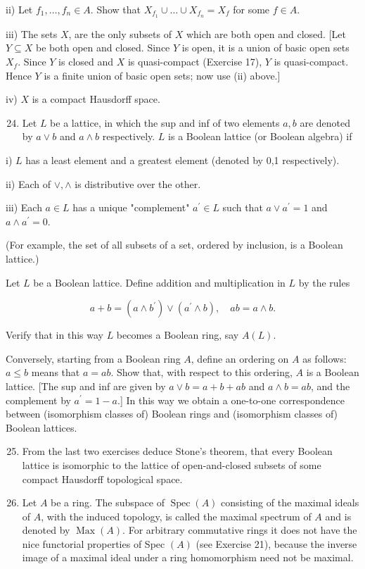 \documentclass{standalone}
\theoremstyle{definition}
\theoremstyle{remark}
\begin{document}
ii) Let $f_{1}, \ldots, f_{n} \in A$. Show that $X_{f_{1}} \cup \ldots \cup X_{f_{n}}=X_{f}$ for some $f \in A$.

iii) The sets $X$, are the only subsets of $X$ which are both open and closed. [Let $Y \subseteq X$ be both open and closed. Since $Y$ is open, it is a union of basic open sets $X_{f}$. Since $Y$ is closed and $X$ is quasi-compact (Exercise 17), $Y$ is quasi-compact. Hence $Y$ is a finite union of basic open sets; now use (ii) above.]

iv) $X$ is a compact Hausdorff space.

\begin{enumerate}
  \setcounter{enumi}{23}
  \item Let $L$ be a lattice, in which the sup and inf of two elements $a, b$ are denoted by $a \vee b$ and $a \wedge b$ respectively. $L$ is a Boolean lattice (or Boolean algebra) if
\end{enumerate}

i) $L$ has a least element and a greatest element (denoted by 0,1 respectively).

ii) Each of $\vee, \wedge$ is distributive over the other.

iii) Each $a \in L$ has a unique "complement" $a^{\prime} \in L$ such that $a \vee a^{\prime}=1$ and $a \wedge a^{\prime}=0$.

(For example, the set of all subsets of a set, ordered by inclusion, is a Boolean lattice.)

Let $L$ be a Boolean lattice. Define addition and multiplication in $L$ by the rules

\[
a+b=\left(a \wedge b^{\prime}\right) \vee\left(a^{\prime} \wedge b\right), \quad a b=a \wedge b .
\]

Verify that in this way $L$ becomes a Boolean ring, say $A(L)$.

Conversely, starting from a Boolean ring $A$, define an ordering on $A$ as follows: $a \leqslant b$ means that $a=a b$. Show that, with respect to this ordering, $A$ is a Boolean lattice. [The sup and inf are given by $a \vee b=a+b+a b$ and $a \wedge b=a b$, and the complement by $a^{\prime}=1-a$.] In this way we obtain a one-to-one correspondence between (isomorphism classes of) Boolean rings and (isomorphism classes of) Boolean lattices.

\begin{enumerate}
  \setcounter{enumi}{24}
  \item From the last two exercises deduce Stone's theorem, that every Boolean lattice is isomorphic to the lattice of open-and-closed subsets of some compact Hausdorff topological space.

  \item Let $A$ be a ring. The subspace of $\operatorname{Spec}(A)$ consisting of the maximal ideals of $A$, with the induced topology, is called the maximal spectrum of $A$ and is denoted by $\operatorname{Max}(A)$. For arbitrary commutative rings it does not have the nice functorial properties of Spec $(A)$ (see Exercise 21), because the inverse image of a maximal ideal under a ring homomorphism need not be maximal.

\end{enumerate}
\end{document}
